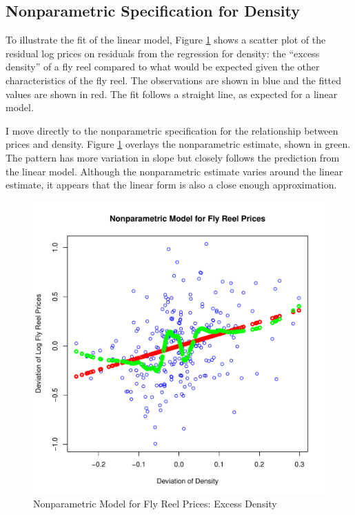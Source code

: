 \documentclass[11pt]{paper}
\begin{document}
\clearpage
\subsection{Nonparametric Specification for Density}

To illustrate the fit of the linear model, 
Figure \ref{fig:dev_np_vs_density_dev} 
shows a scatter plot 
of the residual log prices on 
residuals from the regression for 
density:
the ``excess density'' of a fly reel 
compared to what would be 
expected given the other characteristics of the fly reel. 
The observations are shown in blue
and the fitted values are shown in red.
The fit follows a straight line, as expected for a linear model. 

% 
I move directly to the nonparametric specification for 
the relationship between prices and 
density.
Figure \ref{fig:dev_np_vs_density_dev} 
overlays the nonparametric estimate, shown in green. 
The pattern has more variation in slope but 
closely follows the prediction from the linear model. 
Although the nonparametric estimate varies around the linear estimate,
it appears that the linear form
is also a close enough approximation.


\begin{figure}[h!]
  \centering
  \includegraphics[scale = 0.5, keepaspectratio=true]{../Figures/dev_np_vs_density_dev}
  \caption{Nonparametric Model for Fly Reel Prices: Excess Density} \label{fig:dev_np_vs_density_dev}
\end{figure}
\end{document}
